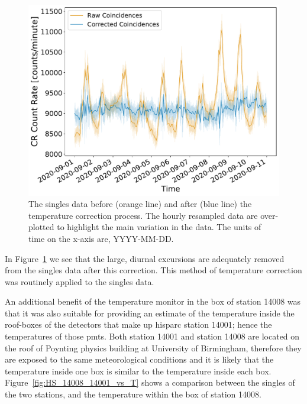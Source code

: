 \begin{figure}[ht!]
	\centering
	\includegraphics[width=0.6\columnwidth]{raw_vs_corrected_singles.pdf}
	\caption{The singles data before (orange line) and after (blue line) the temperature correction process. The hourly resampled data are over-plotted to highlight the main variation in the data. The units of time on the x-axis are, YYYY-MM-DD.}
	\label{fig:HS_14008_corrected_singles}
\end{figure}

In Figure~\ref{fig:HS_14008_corrected_singles} we see that the large, diurnal excursions are adequately removed from the singles data after this correction. This method of temperature correction was routinely applied to the singles data. %


An additional benefit of the temperature monitor in the box of station 14008 was that it was also suitable for providing an estimate of the temperature inside the roof-boxes of the detectors that make up \gls{hisparc} station 14001; hence the temperatures of those \glspl{pmt}. Both station 14001 and station 14008 are located on the roof of Poynting physics building at University of Birmingham, therefore they are exposed to the same meteorological conditions and it is likely that the temperature inside one box is similar to the temperature inside each box. Figure~\ref{fig:HS_14008_14001_vs_T} shows a comparison between the singles of the two stations, and the temperature within the box of station 14008.


